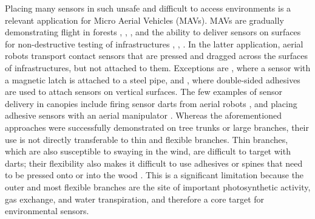 Placing many sensors in such unsafe and difficult to access environments is a relevant application for Micro Aerial Vehicles (MAVs). MAVs are gradually demonstrating flight in forests \cite{Mulgaonkar2018b}, \cite{Tan2017}, \cite{Zheng2020}, and the ability to deliver sensors on surfaces for non-destructive testing of infrastructures \cite{Gonzalez-deSantos2019}, \cite{Ikeda2017}, \cite{Bodie2019}. In the latter application, aerial robots transport contact sensors that are pressed and dragged across the surfaces of infrastructures, but not attached to them. Exceptions are \cite{Jarvis2018}, where a sensor with a magnetic latch is attached to a steel pipe, and \cite{McArthur2018b}, where double-sided adhesives are used to attach sensors on vertical surfaces. The few examples of sensor delivery in canopies include firing sensor darts from aerial robots \cite{Farinha2020}, and placing adhesive sensors with an aerial manipulator \cite{Hamaza2019}. Whereas the aforementioned approaches were successfully demonstrated on tree trunks or large branches, their use is not directly transferable to thin and flexible branches. Thin branches, which are also susceptible to swaying in the wind, are difficult to target with darts; their flexibility also makes it difficult to use adhesives or spines that need to be pressed onto or into the wood \cite{Farinha2020}. This is a significant limitation because the outer and most flexible branches are the site of important photosynthetic activity, gas exchange, and water transpiration, and therefore a core target for environmental sensors.

